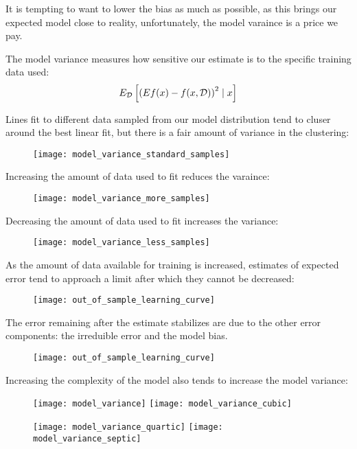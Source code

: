%
%
\begin{frame}
  It is tempting to want to lower the bias as much as possible, as this brings
  our expected model close to reality, unfortunately, the model varaince is a
  price we pay.
\end{frame}
%
%
\begin{frame}
  The model variance measures how sensitive our estimate is to the specific
  training data used:
      $$ E_{\operatorname*{\mathcal{D}}} \left[ \left( Ef(x) - f(x,\operatorname*{\mathcal{D}}) \right)^2 \mid x \right] $$
\end{frame}
%
%
\begin{frame}
   Lines fit to different data sampled from our model distribution tend to
   cluser around the best linear fit, but there is a fair amount of variance in
   the clustering:
  \begin{figure}
    \texttt{[image: model\_variance\_standard\_samples]}
  \end{figure}
\end{frame}
%
%
\begin{frame}
  Increasing the amount of data used to fit reduces the varaince:
  \begin{figure}
    \texttt{[image: model\_variance\_more\_samples]}
  \end{figure}
\end{frame}
%
%
\begin{frame}
  Decreasing the amount of data used to fit increases the variance:
  \begin{figure}
    \texttt{[image: model\_variance\_less\_samples]}
  \end{figure}
\end{frame}
%
%
\begin{frame}
  As the amount of data available for training is increased, estimates of
  expected error tend to approach a limit after which they cannot be decreased:
  \begin{figure}
    \texttt{[image: out\_of\_sample\_learning\_curve]}
  \end{figure}
\end{frame}
%
%
\begin{frame}
  The error remaining after the estimate stabilizes are due to the other error
  components: the irreduible error and the model bias.
  \begin{figure}
    \texttt{[image: out\_of\_sample\_learning\_curve]}
  \end{figure}
\end{frame}
%
%
\begin{frame}
  Increasing the complexity of the model also tends to increase the model
  variance:
  \begin{figure}
      \texttt{[image: model\_variance]}
      \texttt{[image: model\_variance\_cubic]}
  \end{figure}
  \begin{figure}
      \texttt{[image: model\_variance\_quartic]}
      \texttt{[image: model\_variance\_septic]}
  \end{figure}
\end{frame}
